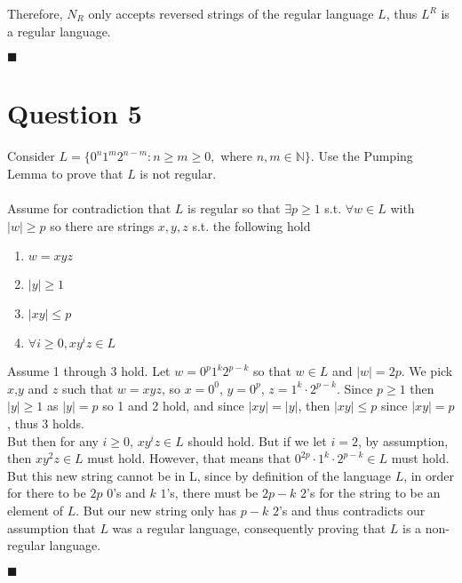 \documentclass[20pt]{article}
\begin{document}
\noindent
\begin{text}
    Therefore, $N_R$ only accepts reversed strings of the regular language $L$, thus $L^R$ is a regular language.
\end{text}

\hfill $\blacksquare$

\newpage

\section*{Question 5}
\begin{text}
    Consider $L = \{0^{n}1^{m}2^{n-m}:n \geq m \geq 0,$ where $n,m\in\mathbb{N}\}$. Use the Pumping Lemma to prove that $L$ is not regular.\\\\

    \noindent
    Assume for contradiction that $L$ is regular so that $\exists p \geq 1$ s.t. $\forall w \in L$ with $|w| \geq p$ so there are strings $x,y,z$ s.t. the following hold
\end{text}

\noindent
\begin{enumerate}
    \item $w=xyz$
    \item $|y| \geq 1$
    \item $|xy| \leq p$
    \item $\forall i \geq 0, xy^{i}z \in L$
\end{enumerate}

\noindent
\begin{text}
    Assume 1 through 3 hold. Let $w = 0^{p}1^{k}2^{p-k}$ so that $w \in L$ and $|w| = 2p$. We pick $x$,$y$ and $z$ such that $w=xyz$, so $x = 0^0$, $y=0^p$, $z = 1^k\cdot2^{p-k}$. Since $p \geq 1$ then $|y| \geq 1$ as $|y| = p$ so  1 and 2 hold, and since $|xy| = |y|$, then $|xy| \leq p$ since $|xy| = p$, thus 3 holds.\\
    
    \noindent
    But then for any $i \geq 0$, $xy^{i}z \in L$ should hold. But if we let $i = 2$, by assumption, then $xy^2z \in L$ must hold. However, that means that $0^{2p} \cdot 1^{k} \cdot 2^{p-k} \in L$ must hold. But this new string cannot be in L, since by definition of the language $L$, in order for there to be $2p$ $0$'s and $k$ $1$'s, there must be $2p-k$ $2$'s for the string to be an element of $L$. But our new string only has $p-k$ $2$'s and thus contradicts our assumption that $L$ was a regular language, consequently proving that $L$ is a non-regular language.
\end{text}

\hfill $\blacksquare$

\end{document}
